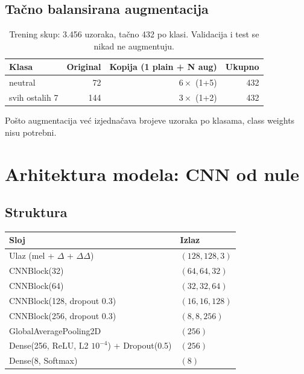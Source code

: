 \documentclass[12pt,a4paper]{article}
\begin{document}
\subsection{Tačno balansirana augmentacija}

\begin{table}[H]
\centering
\begin{tabular}{lrrr}
\toprule
Klasa & Original & Kopija (1 plain + N aug) & Ukupno \\
\midrule
neutral          & 72  & $6\times$ (1+5) & 432 \\
svih ostalih 7   & 144 & $3\times$ (1+2) & 432 \\
\bottomrule
\end{tabular}
\caption{Trening skup: 3.456 uzoraka, tačno 432 po klasi. Validacija i
test se nikad ne augmentuju.}
\end{table}

Pošto augmentacija već izjednačava brojeve uzoraka po klasama, class
weights nisu potrebni.

\section{Arhitektura modela: CNN od nule}

\subsection{Struktura}

\begin{center}
\begin{tabular}{ll}
\toprule
Sloj & Izlaz \\
\midrule
Ulaz (mel + $\Delta$ + $\Delta\Delta$) & $(128, 128, 3)$ \\
CNNBlock(32)                    & $(64, 64, 32)$ \\
CNNBlock(64)                    & $(32, 32, 64)$ \\
CNNBlock(128, dropout 0.3)      & $(16, 16, 128)$ \\
CNNBlock(256, dropout 0.3)      & $(8, 8, 256)$ \\
GlobalAveragePooling2D          & $(256)$ \\
Dense(256, ReLU, L2 $10^{-4}$) + Dropout(0.5) & $(256)$ \\
Dense(8, Softmax)               & $(8)$ \\
\bottomrule
\end{tabular}
\end{center}
\end{document}
